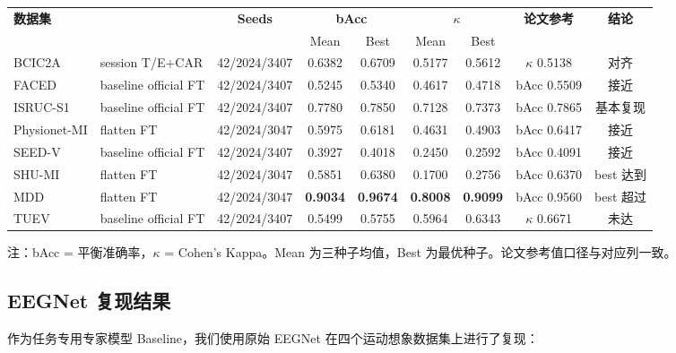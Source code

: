 \documentclass[12pt, a0paper]{article}
\renewcommand{\small}{\fontsize{18}{24}\selectfont}
\renewcommand{\footnotesize}{\fontsize{15}{20}\selectfont}
\begin{document}
\begin{multicols}{2}
{\footnotesize
\begin{center}
\begin{tabularx}{\columnwidth}{l>{\raggedright\arraybackslash}p{3.8cm}ccccccc}
\toprule
\multirow{2}{*}{\textbf{数据集}} & \multirow{2}{*}{\textbf{版本配置}} & \multirow{2}{*}{\textbf{Seeds}} &
\multicolumn{2}{c}{\textbf{bAcc}} & \multicolumn{2}{c}{\textbf{\(\kappa\)}} &
\multirow{2}{*}{\textbf{论文参考}} & \multirow{2}{*}{\textbf{结论}} \\
\cmidrule(lr){4-5} \cmidrule(lr){6-7}
& & & Mean & Best & Mean & Best & & \\
\midrule
BCIC2A & session T/E+CAR & 42/2024/3407 & 0.6382 & 0.6709 & 0.5177 & 0.5612 & \(\kappa\) 0.5138 & \cellcolor{mygreen!15}对齐 \\
FACED & baseline official FT & 42/2024/3407 & 0.5245 & 0.5340 & 0.4617 & 0.4718 & bAcc 0.5509 & 接近 \\
ISRUC-S1 & baseline official FT & 42/2024/3407 & 0.7780 & 0.7850 & 0.7128 & 0.7373 & bAcc 0.7865 & \cellcolor{mygreen!15}基本复现 \\
Physionet-MI & flatten FT & 42/2024/3047 & 0.5975 & 0.6181 & 0.4631 & 0.4903 & bAcc 0.6417 & 接近 \\
SEED-V & baseline official FT & 42/2024/3407 & 0.3927 & 0.4018 & 0.2450 & 0.2592 & bAcc 0.4091 & 接近 \\
SHU-MI & flatten FT & 42/2024/3047 & 0.5851 & 0.6380 & 0.1700 & 0.2756 & bAcc 0.6370 & \cellcolor{mygreen!15}best 达到 \\
MDD & flatten FT & 42/2024/3047 & \textbf{0.9034} & \textbf{0.9674} & \textbf{0.8008} & \textbf{0.9099} & bAcc 0.9560 & \cellcolor{mygreen!15}best 超过 \\
TUEV & baseline official FT & 42/2024/3407 & 0.5499 & 0.5755 & 0.5964 & 0.6343 & \(\kappa\) 0.6671 & 未达 \\
\bottomrule
\end{tabularx}
\end{center}
\vspace{0.3em}
{\small\color{mygray}注：bAcc = 平衡准确率，\(\kappa\) = Cohen's Kappa。Mean 为三种子均值，Best 为最优种子。论文参考值口径与对应列一致。}
}

\subsection{EEGNet 复现结果}

作为任务专用专家模型 Baseline，我们使用原始 EEGNet 在四个运动想象数据集上进行了复现：


\end{multicols}
\end{document}

